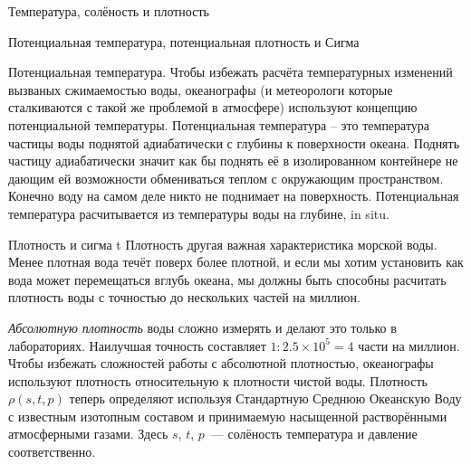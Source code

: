 \begin{chapter}{Температура, солёность и плотность}
\begin{section}{Потенциальная температура, потенциальная плотность и Сигма}
\begin{paragraph}{Потенциальная температура.}
Чтобы избежать расчёта температурных
изменений вызваных сжимаемостью воды, океанографы (и метеорологи
которые сталкиваются с такой же проблемой в атмосфере) используют
концепцию потенциальной температуры. Потенциальная температура –
это температура частицы воды поднятой адиабатически с глубины к
поверхности океана. Поднять частицу адиабатически значит как бы
поднять её в изолированном контейнере не дающим ей возможности
обмениваться теплом с окружающим пространством. Конечно воду на самом
деле никто не поднимает на поверхность. Потенциальная температура
расчитывается из температуры воды на глубине, in situ.
\end{paragraph}

\begin{paragraph}{Плотность и сигма t}
Плотность другая важная характеристика морской воды. Менее плотная
вода течёт поверх более плотной, и если мы хотим установить как вода
может перемещаться вглубь океана, мы должны быть способны расчитать
плотность воды с точностью до нескольких частей на миллион.
%

\textit{Абсолютную плотность} воды сложно измерять и делают это только
в лабораториях. Наилучшая точность составляет $1:2.5\times 10^5 = 4$
части на миллион. Чтобы избежать сложностей работы с абсолютной
плотностью, океанографы используют плотность относительную к плотности
чистой воды. Плотность~$\rho(s,t,p)$ теперь определяют используя
Стандартную Среднюю Океанскую Воду с известным изотопным составом и
принимаемую насыщенной растворёнными атмосферными газами. Здесь $s$,
$t$, $p$~--- солёность температура и давление соответственно.
%
%


\end{paragraph}
\end{section}
\end{chapter}
